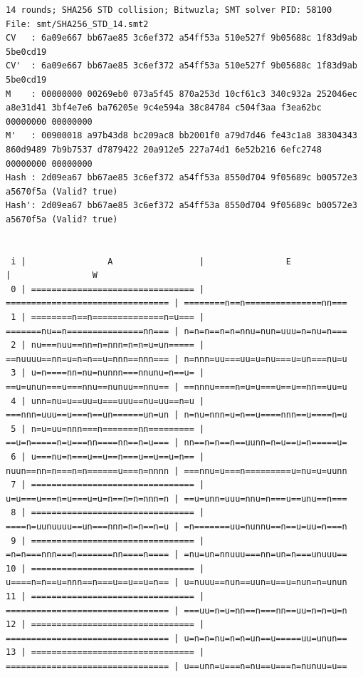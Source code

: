 \documentclass[a4paper]{report}
\begin{document}
\begin{landscape}
\pagebreak
\begin{lstlisting}[caption={14 round collision output obtained by running
\texttt{sha2-collision benchmark --solver bitwuzla --hash-function sha256 --collision-type std --round-range 14..15 -R true -E bruteforce::}}, label=lst:collision-output]
14 rounds; SHA256 STD collision; Bitwuzla; SMT solver PID: 58100
File: smt/SHA256_STD_14.smt2
CV   : 6a09e667 bb67ae85 3c6ef372 a54ff53a 510e527f 9b05688c 1f83d9ab 5be0cd19
CV'  : 6a09e667 bb67ae85 3c6ef372 a54ff53a 510e527f 9b05688c 1f83d9ab 5be0cd19
M    : 00000000 00269eb0 073a5f45 870a253d 10cf61c3 340c932a 252046ec a8e31d41 3bf4e7e6 ba76205e 9c4e594a 38c84784 c504f3aa f3ea62bc 00000000 00000000
M'   : 00900018 a97b43d8 bc209ac8 bb2001f0 a79d7d46 fe43c1a8 38304343 860d9489 7b9b7537 d7879422 20a912e5 227a74d1 6e52b216 6efc2748 00000000 00000000
Hash : 2d09ea67 bb67ae85 3c6ef372 a54ff53a 8550d704 9f05689c b00572e3 a5670f5a (Valid? true)
Hash': 2d09ea67 bb67ae85 3c6ef372 a54ff53a 8550d704 9f05689c b00572e3 a5670f5a (Valid? true)


 i |                A                 |                E                 |                W
 0 | ================================ | ================================ | ========n==n===============nn===
 1 | ========n==n==============n=u=== | =======nu==n===============nn=== | n=n=n==n=n=nnu=nun=uuu=n=nu=n===
 2 | nu===nuu==nn=n=nnn=n=n=u=un===== | ==nuuuu==nn=u=n=n==u=nnn==nnn=== | n=nnn=uu===uu=u=nu===u=un===nu=u
 3 | u=n====nn=nu=nunnn===nnunu=n==u= | ==u=unun===u===nnu==nunuu==nnu== | ==nnnu====n=u=u===u==u==nn==uu=u
 4 | unn=nu=u==uu=u===uuu==nu=uu==n=u | ===nnn=uuu==u===n==un======un=un | n=nu=nnn=u=n==u====nnn==u====n=u
 5 | n=u=uu=nnn===n=======nn========= | ==u=n=====n=u===nn====nn==n=u=== | nn==n=n==n==uunn=n=u==u=n=====u=
 6 | u===nu=n===u==u==n===u==u==u=n== | nuun==nn=n===n=n======u===n=nnnn | ===nnu=u===n=========u=nu=u=uunn
 7 | ================================ | u=u===u===n=u===u=u=n==n=n=nnn=n | ==u=unn=uuu=nnu=n===u==unu==n===
 8 | ================================ | ====n=uunuuuu==un===nnn=n=n==n=u | =n=======uu=nunnu==n==u=uu=n===n
 9 | ================================ | =n=n===nnn===n=======nn====n==== | =nu=un=nnuuu===nn=un=n===unuuu==
10 | ================================ | u====n=n==u=nnn==n===u==u==u=n== | u=nuuu==nun==uun=u==u=nun=n=unun
11 | ================================ | ================================ | ===uu=n=u=nn==n===nn==uu=n=n=u=n
12 | ================================ | ================================ | u=n=n=nu=n=n=un==u=====uu=unun==
13 | ================================ | ================================ | u==unn=u===n=nu==u===n=nunuu=u==
\end{lstlisting}
\end{landscape}
\end{document}
